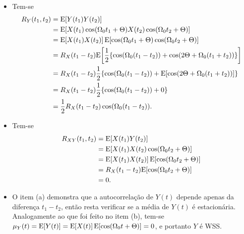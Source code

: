 \begin{respostas}
    \begin{itemize}
        \item [a)] Tem-se
        \begin{align}
            R_Y(t_1, t_2) 
            &= \mathrm{E}\!\left[Y(t_1)Y(t_2)\right] \\
            &= \mathrm{E}\!\left[X(t_1)\cos(\Omega_0 t_1 + \Theta)X(t_2)\cos(\Omega_0 t_2 + \Theta)\right] \\
            &= \mathrm{E}\!\left[X(t_1)X(t_2)\right]\mathrm{E}\!\left[\cos(\Omega_0 t_1 + \Theta)\cos(\Omega_0 t_2 + \Theta)\right] \\
            &= R_X(t_1 - t_2)\mathrm{E}\!\left[\frac{1}{2} \{
                \cos(\Omega_0 (t_1 - t_2)) + 
                \cos(2\Theta + \Omega_0 (t_1 + t_2))
            \}\right] \\ 
            &= R_X(t_1 - t_2)\frac{1}{2} \{
                \cos(\Omega_0 (t_1 - t_2)) + 
                \mathrm{E}\!\left[\cos(2\Theta + \Omega_0 (t_1 + t_2))\right]
            \} \\
            &= R_X(t_1 - t_2)\frac{1}{2} \{
                \cos(\Omega_0 (t_1 - t_2)) + 
                0
            \} \\
            &= \frac{1}{2} R_X(t_1 - t_2) \cos(\Omega_0 (t_1 - t_2)).
        \end{align}

        \item [b)] Tem-se
        \begin{align}
            R_{XY}(t_1, t_2) 
            &= \mathrm{E}\!\left[X(t_1)Y(t_2)\right] \\
            &= \mathrm{E}\!\left[X(t_1)X(t_2)\cos(\Omega_0 t_2 + \Theta)\right] \\
            &= \mathrm{E}\!\left[X(t_1)X(t_2)\right]\mathrm{E}\!\left[\cos(\Omega_0 t_2 + \Theta)\right] \\
            &= R_X(t_1 - t_2)\mathrm{E}\!\left[\cos(\Omega_0 t_2 + \Theta)\right] \\
            &= 0.
        \end{align}

        \item [c)] 
        O item (a) demonstra que a autocorrelação de $Y(t)$ depende apenas da diferença $t_1 - t_2$,
        então resta verificar se a média de $Y(t)$ é estacionária.
        Analogamente ao que foi feito no item (b), tem-se
        $\mu_Y(t) = \mathrm{E}\!\left[Y(t)\right] = \mathrm{E}\!\left[X(t)\right]\mathrm{E}\!\left[\cos(\Omega_0 t + \Theta)\right] = 0$,
        e portanto $Y$ é WSS.
    \end{itemize}
\end{respostas}